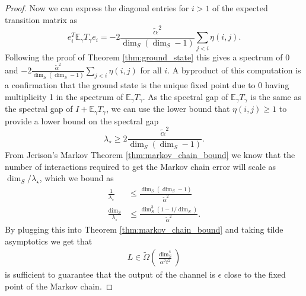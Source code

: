 \documentclass{article}
\newcommand{\parens}[1]{\left( #1 \right)}
\newcommand{\EE}{\mathbb{E}}
\begin{document}
\begin{proof}
    Now we can express the diagonal entries for $i > 1$ of the expected transition matrix as
    \begin{equation}
        e_i^T \EE_\gamma T_\gamma e_i = - 2\frac{\widetilde{\alpha}^2 }{\dim_S(\dim_S - 1)} \sum_{j < i} \eta(i,j).
    \end{equation}
    Following the proof of Theorem \ref{thm:ground_state} this gives a spectrum of 0 and $- 2\frac{\widetilde{\alpha}^2}{\dim_S (\dim_S - 1)} \sum_{j < i} \eta(i,j)$ for all $i$. A byproduct of this computation is a confirmation that the ground state is the unique fixed point due to 0 having multiplicity 1 in the spectrum of $\EE_\gamma T_\gamma$. As the spectral gap of $\EE_\gamma T_\gamma$ is the same as the spectral gap of $I + \EE_\gamma T_\gamma$,
    we can use the lower bound that $\eta(i,j) \ge 1$ to provide a lower bound on the spectral gap
    \begin{equation}
        \lambda_\star \ge 2 \frac{\widetilde{\alpha}^2 }{\dim_S(\dim_S - 1)}.
    \end{equation}
    From Jerison's Markov Theorem \ref{thm:markov_chain_bound} we know that the number of interactions required to get the Markov chain error will scale as $\dim_S / \lambda_\star$, which we bound as
\begin{align}
    \frac{1}{\lambda_\star} &\le \frac{\dim_S (\dim_S - 1)}{\widetilde{\alpha}^2} \\
    \frac{\dim_S}{\lambda_\star} &\le \frac{\dim_S^3 (1 - 1/\dim_S)}{\widetilde{\alpha}^2}.
\end{align}
By plugging this into Theorem \ref{thm:markov_chain_bound} and taking tilde asymptotics we get that
\begin{align}
    L \in \widetilde{\Omega} \parens{\frac{\dim_S^4}{\alpha^2 t^2}}
\end{align}
is sufficient to guarantee that the output of the channel is $\epsilon$ close to the fixed point of the Markov chain. 


\end{proof}
\end{document}
